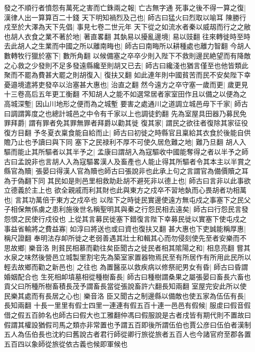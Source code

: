 發之不順行者憤怨有萬死之害而亡銖兩之報|{
	亡古無字通}
死事之後不得一算之復|{
	漢律人出一算算百二十錢}
天下明知禍烈及己也|{
	師古曰猛火曰烈取以喻耳}
陳勝行戍至於大澤為天下先倡|{
	事見七卷二世元年}
天下從之如流水者秦以威刼而行之之敝也胡人衣食之業不著於地|{
	著直畧翻}
其埶易以擾亂邊境|{
	易以豉翻}
往來轉徙時至時去此胡人之生業而中國之所以離南畮也|{
	師古曰南畮所以耕種處也離力智翻}
今胡人數轉牧行獵於塞下|{
	數所角翻}
以候備塞之卒卒少則入陛下不救則邊民絶望而有降敵之心救之少發則不足多發遠縣纔至則胡又已去|{
	師古曰纔淺也猶言僅至也他皆類此}
聚而不罷為費甚大罷之則胡復入|{
	復扶又翻}
如此連年則中國貧苦而民不安矣陛下幸憂邉境遣將吏發卒以治塞甚大惠也|{
	治直之翻}
然今遠方之卒守塞一歲而更|{
	歲更見十三卷高后五年更工衡翻}
不知胡人之能不如選常居者家室田作且以備之以便為之高城深塹|{
	因山川地形之便而為之城塹}
要害之處通川之道調立城邑毋下千家|{
	師古曰調謂筭度之也總計城邑之中令有千家以上也調徒釣翻}
先為室屋具田器乃募民免罪拜爵|{
	謂有罪者免其罪無罪者拜爵以勸其徙}
復其家|{
	謂民之欲往者復除其家征役復方目翻}
予冬夏衣稟食能自給而止|{
	師古曰初徙之時縣官且稟給其衣食於後能自供贍乃止也予讀曰與下同}
塞下之民禄利不厚不可使久居危難之地|{
	難乃旦翻}
胡人入驅而能止其所驅者以其半予之|{
	孟康曰謂胡入為寇驅收中國能奪得之者以半予之師古曰孟說非也言胡人入為寇驅畧漢人及畜產也人能止得其所驅者令其本主以半賞之}
縣官為贖|{
	張晏曰得漢人官為贖也師古曰張說非也此承上句之言謂官為備價贖之耳為于偽翻下同}
其民如是則邑里相救助赴胡不避死非以德上也|{
	師古曰言非以此事欲立德義於主上也}
欲全親戚而利其財也此與東方之戍卒不習地埶而心畏胡者功相萬也|{
	言其功萬倍于東方之戍卒也}
以陛下之時徙民實邊使遠方無屯戍之事塞下之民父子相保無係虜之患利施後世名稱聖明其與秦之行怨民相去遠矣|{
	師古曰行怨民言發怨恨之民使行戍役也}
上從其言募民徙塞下錯復言陛下幸募民徙以實塞下使屯戍之事益省輸將之費益寡|{
	如淳曰將送也或曰資也復扶又翻}
甚大惠也下吏誠能稱厚惠|{
	稱尺證翻}
奉明法存卹所徙之老弱善遇其壯士和輯其心而勿侵刻使先至者安樂而不思故鄉|{
	樂音洛}
則貧民相慕而勸往矣臣聞古之徙民者相其隂陽之和|{
	相息亮翻}
嘗其水泉之味然後營邑立城製里割宅先為築室家置器物焉民至有所居作有所用此民所以輕去故鄉而勸之新邑也|{
	之往也}
為置醫巫以救疾病以修祭祀男女有昏|{
	師古曰昏謂婚姻配合也}
生死相卹墳墓相從種樹畜長|{
	師古曰種樹謂桑果之屬張晏曰畜長六畜也貢父曰所種所樹畜積長茂予謂畜長當從張說畜許六翻長知兩翻}
室屋完安此所以使民樂其處而有長居之心也|{
	樂音洛}
臣又聞古之制邊縣以備敵也使五家為伍伍有長|{
	長知兩翻}
十長一里里有假士四里一連連有假五百十連一邑邑有假候|{
	服䖍曰假音假借之假五百帥名也師古曰假大也工雅翻仲馮曰假服說是古者戌皆有期代則不置故曰假謂其權設猶假司馬之類亦非常置也予謂五百即後所謂伍伯也賈公彦曰伍伯者漢制五人為伍伯長也沈約曰舊說古者君行師從卿行旅從旅者五百人也今諸官府至郡各置五百四以象師從旅從依古義也候即軍候也}
